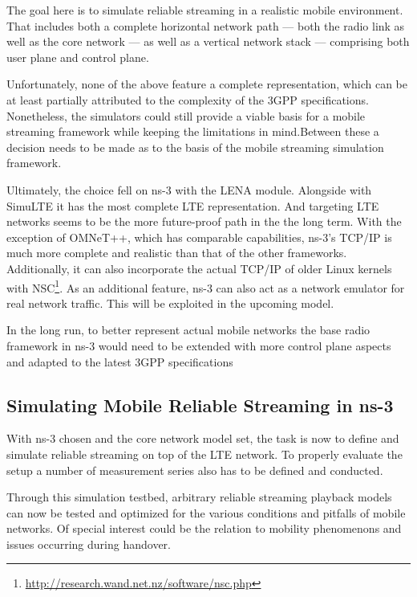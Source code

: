 The goal here is to simulate reliable streaming in a realistic mobile environment. That includes both a complete horizontal network path --- both the radio link as well as the core network --- as well as a vertical network stack --- comprising both user plane and control plane.

Unfortunately, none of the above feature a complete representation, which can be at least partially attributed to the complexity of the \gls{3GPP} specifications. Nonetheless, the simulators could still provide a viable basis for a mobile streaming framework while keeping the limitations in mind.Between these a decision needs to be made as to the basis of the mobile streaming simulation framework. 

Ultimately, the choice fell on ns-3 with the LENA module. Alongside with SimuLTE it has the most complete \gls{LTE} representation. And targeting \gls{LTE} networks seems to be the more future-proof path in the the long term. With the exception of OMNeT++, which has comparable capabilities, ns-3's \gls{TCP}/\gls{IP} is much more complete and realistic than that of the other frameworks. Additionally, it can also incorporate the actual \gls{TCP}/\gls{IP} of older Linux kernels with NSC\footnote{\url{http://research.wand.net.nz/software/nsc.php}}. As an additional feature, ns-3 can also act as a network emulator for real network traffic. This will be exploited in the upcoming model.

In the long run, to better represent actual mobile networks the base radio framework in ns-3 would need to be extended with more control plane aspects and adapted to the latest \gls{3GPP} specifications


\subsection{Simulating Mobile Reliable Streaming in ns-3}

With ns-3 chosen and the core network model set, the task is now to define and simulate reliable streaming on top of the \gls{LTE} network. To properly evaluate the setup a number of measurement series also has to be defined and conducted.

Through this simulation testbed, arbitrary reliable streaming playback models can now be tested and optimized for the various conditions and pitfalls of mobile networks. Of special interest could be the relation to mobility phenomenons and issues occurring during handover.

